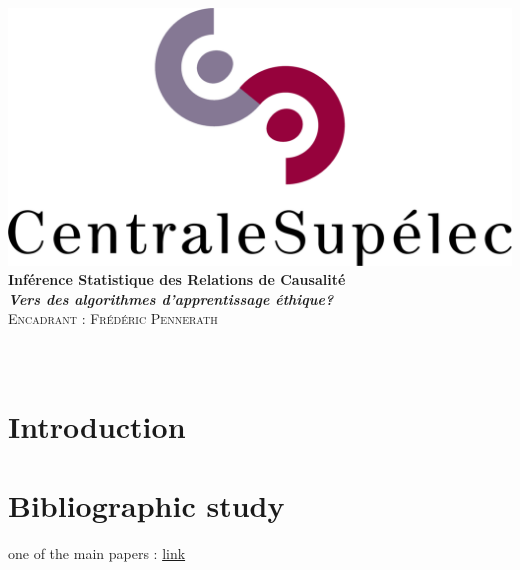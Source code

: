 \documentclass{article}
\author{\Large \textsc{Mohammed FELLAJI, Ahmed BEN AISSA}}
\date{September, 2020}
\begin{document}
\hypersetup{pdfborder=0 0 0} 		%


\makeatletter
  \begin{titlepage}
  \centering
     {\large \textsc{   }}\\
     \vspace{1em}
    \centering
      \includegraphics[width=0.5 \textwidth]{figures/LogoCS.png} \\
    \vspace{4cm}
      {\LARGE\textbf{Inférence Statistique des Relations de Causalité}\\
       \vspace{1em}
       {\large\textbf{
       \textit{\LARGE{Vers des algorithmes d'apprentissage éthique?}}}}\\
    \vspace{4cm}
    \centering
     {\Large \textsc{Encadrant : Frédéric Pennerath}}\\
     \vspace{1em}
        {\Large \@author} \\
        \vspace{3em}
        {\Large \@date} }\\
  \end{titlepage}
 
 
\makeatother

\tableofcontents




\newpage
\section{Introduction}


\newpage
\section{Bibliographic study}
one of the main papers : \cite{pearl2019seven} \href{https://cacm.acm.org/magazines/2019/3/234929-the-seven-tools-of-causal-inference-with-reflections-on-machine-learning/fulltext?mobile=false}{link}
\end{document}
